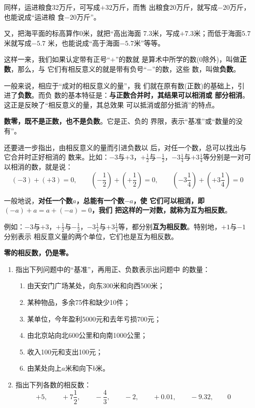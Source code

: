 同样，运进粮食32万斤，可写成$+32$万斤，而售
出粮食20万斤，就写成$-20$万斤，也能说成“运进粮
食$-20$万斤”。

    又，把海平面的标高算作0米，就把“高出海面
7.3米，写成$+7. 3$米；而低于海面$5.7$米就写成$-5.7$
米，也能说成“高于海面$-5. 7$米”等等。

    这样一来，我们如果认定带有正号“$+$”的数就
是算术中所学的数(0除外)，叫做\textbf{正数}，那么，与
它们有相反意义的就是带有负号“$-$”的数，这些
数，叫做\textbf{负数}。

    一般来说，相应于“成对的相反意义的量”，我
们就在原有数(正数)的基础上，引进了\textbf{负数}。而负
数的基本特征是：\textbf{与正数合并时，其结果可以相消或
部分相消}。这正是反映了“相反意义的量，其总效果
可以抵消或部分抵消”的特点。

\textbf{数零，既不是正数，也不是负数}。它是正、负的
界限，表示“基准”或“数量的没有”。

    还要进一步指出，由相反意义的量而引进负数以
后，对任一个数，总可以找出与它合并时正好相消的
数来。比如：$-3$与$+3$，$+\frac{1}{2}$与$-\frac{1}{2}$，$-3\frac{1}{4}$与$+3\frac{1}{4}$等分别是一对可以相消的数，就是说：
\[(-3)+(+3)=0,\qquad \left(-\frac{1}{2}\right)+\left(+\frac{1}{2}\right)=0,\qquad \left(-3\frac{1}{4}\right)+\left(+3\frac{1}{4}\right)=0 \]

一般地说，\textbf{对任一个数$a$，总能有一个数$-a$，使
它们可以相消，即$(-a) +a=a+ (-a) = 0$，我们
把这样的一对数，就称为互为相反数}。

例如：$-3$与$+3$，$+\frac{1}{2}$与$-\frac{1}{2}$，$-3\frac{1}{4}$与$+3\frac{1}{4}$等，都分别\textbf{互为相反数}。特别地，$+1$与$-1$分别表示
相反意义量的两个单位，它们也是互为相反数。

\textbf{零的相反数，仍是零。}

\begin{ex}
 \begin{enumerate}
     \item 指出下列问题中的“基准”，再用正、负数表示出问题中
     的数量：
     \begin{enumerate}
         \item 由天安门广场某处，向东300米和向西500米；
         \item 某种物品，多余75件和缺少10件；
         \item 某单位，今年盈利5000元和去年亏损700元；
         \item 由北京站向北600公里和向南1000公里；
         \item 收入100元和支出100元；
         \item 由某处向上$a$米和向下$b$米。
     \end{enumerate}

       \item 指出下列各数的相反数：
   \[+5,\qquad +7\frac{1}{2},\qquad -\frac{4}{3},\qquad -2,\qquad +0.01,\qquad -9.32,\qquad 0 \]
 \end{enumerate}   
\end{ex}

